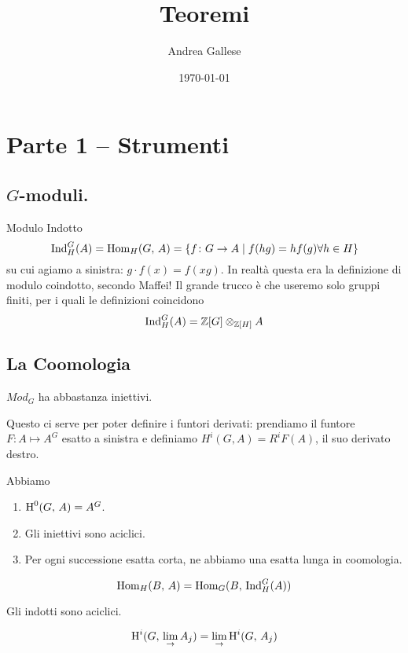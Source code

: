 \documentclass[a4paper]{article}
\title{Teoremi}\let\Title\@title
\author{Andrea Gallese}\let\Author\@author
\date{\today}\let\Date\@date
\begin{document}
	
	\section{Parte 1 -- Strumenti}
	
	\subsection{$ G $-moduli.}
	\begin{definition}{Modulo Indotto}
		\[ \operatorname{Ind}_H^G(A) = \operatorname{Hom}_H(G, \, A) = \{ f \colon G \to A \mid f(hg) = h f(g) \forall h \in H \} \]
		su cui agiamo a sinistra: $ g \cdot f(x) = f(xg) $. In realtà questa era la definizione di modulo coindotto, secondo Maffei! Il grande trucco è che useremo solo gruppi finiti, per i quali le definizioni coincidono
		\[ \operatorname{Ind}_H^G(A) = \mathbb{Z}[G] \otimes_{\mathbb{Z}[H]} A \]
	\end{definition}

	\subsection{La Coomologia}
	\begin{theorem}
		$ Mod_G $ ha abbastanza iniettivi.
	\end{theorem}

	Questo ci serve per poter definire i funtori derivati: prendiamo il funtore $ F \colon A \mapsto A^G $ esatto a sinistra e definiamo $ H^i(G, A) = R^iF(A) $, il suo derivato destro.
	
	\begin{theorem}
		Abbiamo
		\begin{enumerate}
			\item $ \operatorname{H}^0(G,\, A) = A^G $.
			\item Gli iniettivi sono aciclici.
			\item Per ogni successione esatta corta, ne abbiamo una esatta lunga in coomologia.
		\end{enumerate}
	\end{theorem}

	\begin{theorem}
		\[ \operatorname{Hom}_H(B,\, A) = \operatorname{Hom}_G(B, \, \operatorname{Ind}_H^G(A)) \]
	\end{theorem}

	\begin{theorem}
		Gli indotti sono aciclici.
	\end{theorem}

	\begin{theorem}
		\[ \operatorname{H}^i(G, \, \lim_{\rightarrow} A_j) =  \lim_{\rightarrow}\operatorname{H}^i(G, \, A_j) \]
	\end{theorem}
\end{document}
